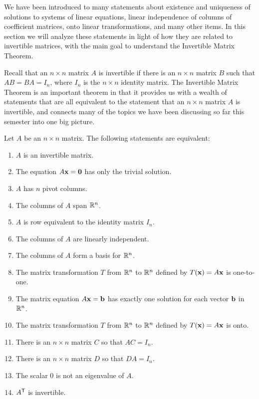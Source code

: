 
We have been introduced to many statements about existence and uniqueness of solutions to systems of linear equations, linear independence of columns of coefficient matrices, onto linear transformations, and many other items. In this section we will analyze these statements in light of how they are related to invertible matrices, with the main goal to understand the Invertible Matrix Theorem. 

Recall that an $n \times n$ matrix $A$ is invertible if there is an $n \times n$ matrix $B$ such that $AB = BA = I_n$, where $I_n$ is the $n \times n$ identity matrix. The Invertible Matrix Theorem is an important theorem in that it provides us with a wealth of statements that are all equivalent to the statement that an $n \times n$ matrix $A$ is invertible, and connects many of the topics we have been discussing so far this semester into one big picture. 



\begin{theorem} Let $A$ be an $n \times n$ matrix. The following statements are equivalent:
\begin{enumerate}
\item $A$ is an invertible matrix.
\item \label{item:trivial_soln} The equation $A \mathbf{x} = \mathbf{0}$ has only the trivial solution.
\item $A$ has $n$ pivot columns. 
\item The columns of $A$ span $\mathbb{R}^n$.
\item $A$ is row equivalent to the identity matrix $I_n$.
\item The columns of $A$ are linearly independent.
\item The columns of $A$ form a basis for $\mathbb{R}^n$.
\item The matrix transformation $T$ from $\mathbb{R}^n$ to $\mathbb{R}^n$ defined by $T(\mathbf{x}) = A\mathbf{x}$ is one-to-one.
\item The matrix equation $A \mathbf{x} = \mathbf{b}$ has exactly one solution for each vector $\mathbf{b}$ in $\mathbb{R}^n$.
\item The matrix transformation $T$ from $\mathbb{R}^n$ to $\mathbb{R}^n$ defined by $T(\mathbf{x}) = A\mathbf{x}$ is onto.
\item \label{item:AC_I} There is an $n \times n$ matrix $C$ so that $AC = I_n$.
\item \label{item:DA_I} There is an $n \times n$ matrix $D$ so that $DA = I_n$.
\item The scalar 0 is not an eigenvalue of $A$.
\item $A^{\mathsf{T}}$ is invertible.
\end{enumerate}
\end{theorem}




